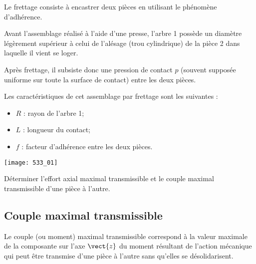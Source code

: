 \normaltrue \difficilefalse \tdifficilefalse
\correctionfalse


\setcounter{question}{0}
\ifcorrection
\else
{}
\fi



Le frettage consiste à encastrer deux pièces en utilisant le phénomène d’adhérence. 
 
Avant l’assemblage réalisé à l’aide d’une presse, l’arbre 1 
possède un diamètre légèrement supérieur à celui de l’alésage 
(trou cylindrique) de la pièce 2 dans laquelle il vient se loger. 
 
Après frettage, il subsiste donc une pression de contact $p$ 
(souvent supposée uniforme sur toute la surface de contact) 
entre les deux pièces. 

 
Les caractéristiques de cet assemblage par frettage sont les suivantes : 
\begin{itemize}
\item $R$ : rayon de l’arbre 1;
\item $L$ : longueur du contact; 
\item $f$ : facteur d’adhérence entre les deux pièces.
\end{itemize}



\begin{center}
\texttt{[image: 533\_01]}
\end{center}


\begin{obj}
Déterminer l’effort axial maximal transmissible et le couple maximal transmissible d’une pièce à 
l’autre.
\end{obj}




\subsection*{Couple maximal transmissible}


Le couple (ou moment) maximal transmissible correspond à la valeur maximale 
de la composante sur l’axe $\vect{z}$ du moment résultant de l’action mécanique qui peut 
être transmise d’une pièce à l’autre sans qu’elles se désolidarisent. 
 
